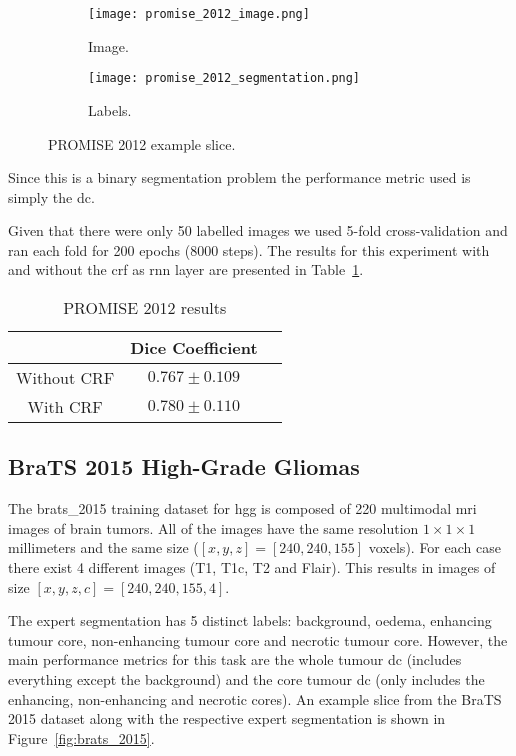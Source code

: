 \documentclass{article}
\begin{document}
\begin{figure}[ht]
\centering
\begin{subfigure}{.25\textwidth}
  \centering
  \texttt{[image: promise\_2012\_image.png]}
  \caption{Image.}
\end{subfigure}\begin{subfigure}{.25\textwidth}
  \centering
  \texttt{[image: promise\_2012\_segmentation.png]}
  \caption{Labels.}
\end{subfigure}
\caption{PROMISE 2012 example slice.}
\label{fig:promise_2012}
\end{figure}

Since this is a binary segmentation problem the performance metric used is simply the \gls{dc}.

Given that there were only 50 labelled images we used 5-fold cross-validation and ran each fold for 200 epochs (8000 steps). The results for this experiment with and without the \gls{crf} as \gls{rnn} layer are presented in Table~\ref{tab:promise_2012}.

\begin{table}[!ht]
\centering
\caption{PROMISE 2012 results}
\label{tab:promise_2012}
\begin{tabular}{@{}ccc@{}}
\toprule
            & Dice Coefficient   \\ \midrule
Without CRF & $0.767 \pm 0.109$  \\
With CRF    & $0.780 \pm 0.110$  \\ \bottomrule
\end{tabular}
\end{table}


\subsection{BraTS 2015 High-Grade Gliomas}

The \gls{brats_2015} \cite{BRATS_2015} training dataset for \gls{hgg} is composed of 220 multimodal \gls{mri} images of brain tumors.
All of the images have the same resolution $1\times 1 \times 1$ millimeters and the same size ($[x, y, z] = [240, 240, 155]$ voxels). 
For each case there exist 4 different images (T1, T1c, T2 and Flair).
This results in images of size $[x, y, z, c] = [240, 240, 155, 4]$.

The expert segmentation has 5 distinct labels: background, oedema, enhancing tumour core, non-enhancing tumour core and necrotic tumour core.
However, the main performance metrics for this task are the whole tumour \gls{dc} (includes everything except the background) and the core tumour \gls{dc} (only includes the enhancing, non-enhancing and necrotic cores).
An example slice from the BraTS 2015 dataset along with the respective expert segmentation is shown in Figure~\ref{fig:brats_2015}.
\end{document}
